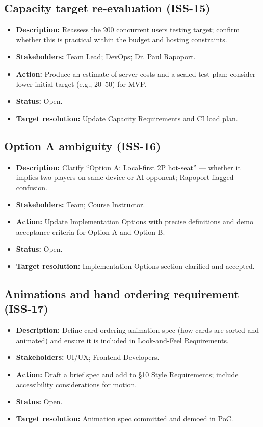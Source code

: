 \documentclass[12pt]{article}
\begin{document}
\subsection{Capacity target re-evaluation (ISS-15)}
\begin{itemize}
  \item \textbf{Description:} Reassess the 200 concurrent users testing target; confirm whether this is practical within the budget and hosting constraints.
  \item \textbf{Stakeholders:} Team Lead; DevOps; Dr. Paul Rapoport.
  \item \textbf{Action:} Produce an estimate of server costs and a scaled test plan; consider lower initial target (e.g., 20--50) for MVP.
  \item \textbf{Status:} Open.
  \item \textbf{Target resolution:} Update Capacity Requirements and CI load plan.
\end{itemize}

\subsection{Option A ambiguity (ISS-16)}
\begin{itemize}
  \item \textbf{Description:} Clarify “Option A: Local-first 2P hot-seat” — whether it implies two players on same device or AI opponent; Rapoport flagged confusion.
  \item \textbf{Stakeholders:} Team; Course Instructor.
  \item \textbf{Action:} Update Implementation Options with precise definitions and demo acceptance criteria for Option A and Option B.
  \item \textbf{Status:} Open.
  \item \textbf{Target resolution:} Implementation Options section clarified and accepted.
\end{itemize}

\subsection{Animations and hand ordering requirement (ISS-17)}
\begin{itemize}
  \item \textbf{Description:} Define card ordering animation spec (how cards are sorted and animated) and ensure it is included in Look-and-Feel Requirements.
  \item \textbf{Stakeholders:} UI/UX; Frontend Developers.
  \item \textbf{Action:} Draft a brief spec and add to \S10 Style Requirements; include accessibility considerations for motion.
  \item \textbf{Status:} Open.
  \item \textbf{Target resolution:} Animation spec committed and demoed in PoC.
\end{itemize}
\end{document}
